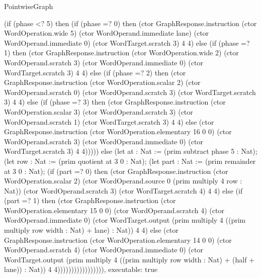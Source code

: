 \begin{lexlean}{PointwiseGraph}
\begin{semanticmodule}
{      (if (phase <? 5) then (if (phase =? 0) then (ctor GraphResponse.instruction (ctor WordOperation.wide 5) (ctor WordOperand.immediate lane) (ctor WordOperand.immediate 0) (ctor WordTarget.scratch 3) 4 4) else (if (phase =? 1) then (ctor GraphResponse.instruction (ctor WordOperation.wide 2) (ctor WordOperand.scratch 3) (ctor WordOperand.immediate 0) (ctor WordTarget.scratch 3) 4 4) else (if (phase =? 2) then (ctor GraphResponse.instruction (ctor WordOperation.scalar 2) (ctor WordOperand.scratch 0) (ctor WordOperand.scratch 3) (ctor WordTarget.scratch 3) 4 4) else (if (phase =? 3) then (ctor GraphResponse.instruction (ctor WordOperation.scalar 3) (ctor WordOperand.scratch 3) (ctor WordOperand.scratch 1) (ctor WordTarget.scratch 3) 4 4) else (ctor GraphResponse.instruction (ctor WordOperation.elementary 16 0 0) (ctor WordOperand.scratch 3) (ctor WordOperand.immediate 0) (ctor WordTarget.scratch 3) 4 4))))) else (let at : Nat := (prim subtract phase 5 : Nat);
      (let row : Nat := (prim quotient at 3 0 : Nat);
      (let part : Nat := (prim remainder at 3 0 : Nat);
      (if (part =? 0) then (ctor GraphResponse.instruction (ctor WordOperation.scalar 2) (ctor WordOperand.source 0 (prim multiply 4 row : Nat)) (ctor WordOperand.scratch 3) (ctor WordTarget.scratch 4) 4 4) else (if (part =? 1) then (ctor GraphResponse.instruction (ctor WordOperation.elementary 15 0 0) (ctor WordOperand.scratch 4) (ctor WordOperand.immediate 0) (ctor WordTarget.output (prim multiply 4 ((prim multiply row width : Nat) + lane) : Nat)) 4 4) else (ctor GraphResponse.instruction (ctor WordOperation.elementary 14 0 0) (ctor WordOperand.scratch 4) (ctor WordOperand.immediate 0) (ctor WordTarget.output (prim multiply 4 ((prim multiply row width : Nat) + (half + lane)) : Nat)) 4 4))))))))))))))))),
  executable: true
}


\end{semanticmodule}
\end{lexlean}
